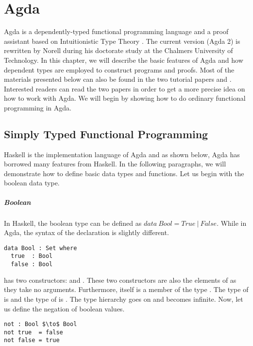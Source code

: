 \chapter{Agda}
\par Agda is a dependently-typed functional programming language and a
proof assistant based on Intuitionistic Type Theory
\cite{martin1984}. The current version (Agda 2) is rewritten by Norell
\cite{norell2007} during his doctorate study at the Chalmers University of
Technology. In this chapter, we will describe the basic features of
Agda and how dependent types are employed to construct programs and
proofs. Most of the materials presented below can also be
found in the two tutorial papers \cite{bove2009} and
\cite{norell2008}. Interested readers can read the two papers in order to get
a more precise idea on how to work with Agda. We will begin by
showing how to do ordinary functional programming in Agda. 


\section{Simply Typed Functional Programming}
\par Haskell is the implementation language
of Agda and as shown below, Agda has borrowed many features from
Haskell. In the following paragraphs, we will demonstrate how to
define basic data types and functions. Let us begin with the boolean
data type. 

\paragraph{Boolean} In Haskell, the boolean type can be defined as
\(data\ Bool = True\ |\ False\). While in Agda, the syntax of the
declaration is slightly different. 
\begin{lstlisting}[mathescape=true,xleftmargin=.3\textwidth]
data Bool : Set where
  true  : Bool
  false : Bool
\end{lstlisting}

\par {} has two constructors:  and . These two constructors
are also the elements of  as they take no arguments. Furthermore,  itself is a member of the type
. The type of  is  and the type of  is
. The type hierarchy goes on and becomes infinite. Now, let us define the negation of boolean values. 
\begin{lstlisting}[mathescape=true,xleftmargin=.3\textwidth]
not : Bool $\to$ Bool
not true  = false
not false = true
\end{lstlisting}

